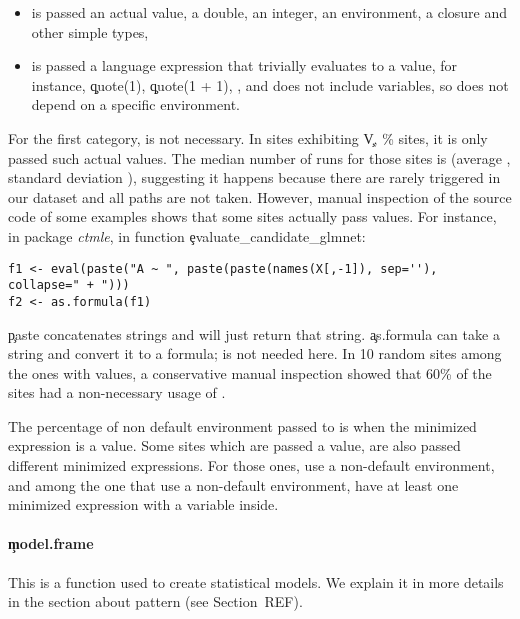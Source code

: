 \documentclass[acmsmall]{acmart}
\begin{document}
\begin{itemize}
	\item \eval is passed an actual value, a double, an integer, an environment, a closure and other simple types,
	\item \eval is passed a language expression that trivially evaluates to a value, for instance, \c{quote(1)}, \c{quote(1 + 1)}, , and does not include variables, so does not depend on a specific environment.
\end{itemize}

For the first category, \eval is not necessary. In \packageNbCallSitesUniqueActualValue sites exhibiting \c{V}, \ie \packageCallSitesUniqueActualValuePercent\% sites, it is only passed such actual values. The median number of runs for those sites is \packageMedianRunSitesUniqueActualValue (average \packageAverageRunSitesUniqueActualValue, standard deviation \packageSdRunSitesUniqueActualValue), suggesting it happens because there are rarely triggered in our dataset and all paths are not taken. However, manual inspection of the source code of some examples shows that some sites actually pass values. For instance, in package \emph{ctmle}, in function \c{evaluate\_candidate\_glmnet}:

\begin{lstlisting}
f1 <- eval(paste("A ~ ", paste(paste(names(X[,-1]), sep=''), collapse=" + ")))
f2 <- as.formula(f1)
\end{lstlisting}

\c{paste} concatenates strings and \eval will just return that string. \c{as.formula} can take a string and convert it to a formula; \eval is not needed here. In 10 random sites among the ones with values, a conservative manual inspection showed that 60\% of the sites  had a non-necessary usage of \eval.

The percentage of non default environment passed to \eval is \packageMinimizedpercentenvirc when the minimized expression is a value. Some sites which are passed a value, are also passed different minimized expressions. For those ones, \packageNonDefaultEnvirValuePercent use a non-default environment, and among the one that use a non-default environment, \packageNonDefaultEnvirWithVarPercent have at least one minimized expression with a variable inside.


\paragraph{\c{model.frame}} This is a function used to create statistical models. We explain it in more details in the section about pattern (see Section~REF).
\end{document}
